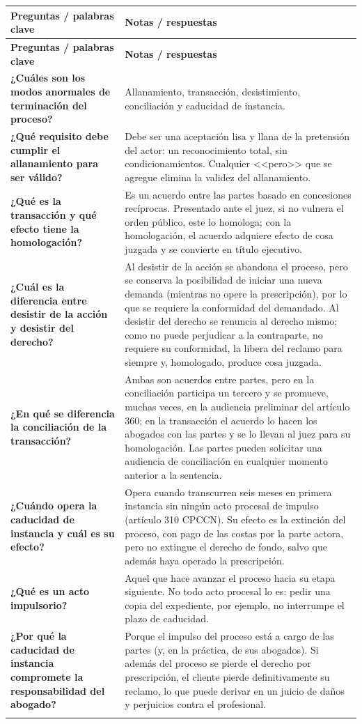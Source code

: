 \documentclass[12pt,oneside]{book}
\newlength{\cqa}
\newlength{\cqb}
\newcommand{\cqheader}{%
  \toprule
  \textbf{Preguntas / palabras clave} & \textbf{Notas / respuestas} \\
  \midrule
}
\newcommand{\cqrow}[2]{%
  \textbf{#1} & #2 \\
  \addlinespace[0.8em]
}
\begin{document}
\begin{longtable}{>{\RaggedRight\arraybackslash}p{\cqa} >{\RaggedRight\arraybackslash}p{\cqb}}
\cqheader
\endfirsthead
\cqheader
\endhead
\cqrow{¿Cuáles son los modos anormales de terminación del proceso?}{Allanamiento, transacción, desistimiento, conciliación y caducidad de instancia.}
\cqrow{¿Qué requisito debe cumplir el allanamiento para ser válido?}{Debe ser una aceptación lisa y llana de la pretensión del actor: un reconocimiento total, sin condicionamientos. Cualquier <<pero>> que se agregue elimina la validez del allanamiento.}
\cqrow{¿Qué es la transacción y qué efecto tiene la homologación?}{Es un acuerdo entre las partes basado en concesiones recíprocas. Presentado ante el juez, si no vulnera el orden público, este lo homologa; con la homologación, el acuerdo adquiere efecto de cosa juzgada y se convierte en título ejecutivo.}
\cqrow{¿Cuál es la diferencia entre desistir de la acción y desistir del derecho?}{Al desistir de la acción se abandona el proceso, pero se conserva la posibilidad de iniciar una nueva demanda (mientras no opere la prescripción), por lo que se requiere la conformidad del demandado. Al desistir del derecho se renuncia al derecho mismo; como no puede perjudicar a la contraparte, no requiere su conformidad, la libera del reclamo para siempre y, homologado, produce cosa juzgada.}
\cqrow{¿En qué se diferencia la conciliación de la transacción?}{Ambas son acuerdos entre partes, pero en la conciliación participa un tercero y se promueve, muchas veces, en la audiencia preliminar del artículo 360; en la transacción el acuerdo lo hacen los abogados con las partes y se lo llevan al juez para su homologación. Las partes pueden solicitar una audiencia de conciliación en cualquier momento anterior a la sentencia.}
\cqrow{¿Cuándo opera la caducidad de instancia y cuál es su efecto?}{Opera cuando transcurren seis meses en primera instancia sin ningún acto procesal de impulso (artículo 310 CPCCN). Su efecto es la extinción del proceso, con pago de las costas por la parte actora, pero no extingue el derecho de fondo, salvo que además haya operado la prescripción.}
\cqrow{¿Qué es un acto impulsorio?}{Aquel que hace avanzar el proceso hacia su etapa siguiente. No todo acto procesal lo es: pedir una copia del expediente, por ejemplo, no interrumpe el plazo de caducidad.}
\cqrow{¿Por qué la caducidad de instancia compromete la responsabilidad del abogado?}{Porque el impulso del proceso está a cargo de las partes (y, en la práctica, de sus abogados). Si además del proceso se pierde el derecho por prescripción, el cliente pierde definitivamente su reclamo, lo que puede derivar en un juicio de daños y perjuicios contra el profesional.}

\end{longtable}
\end{document}
